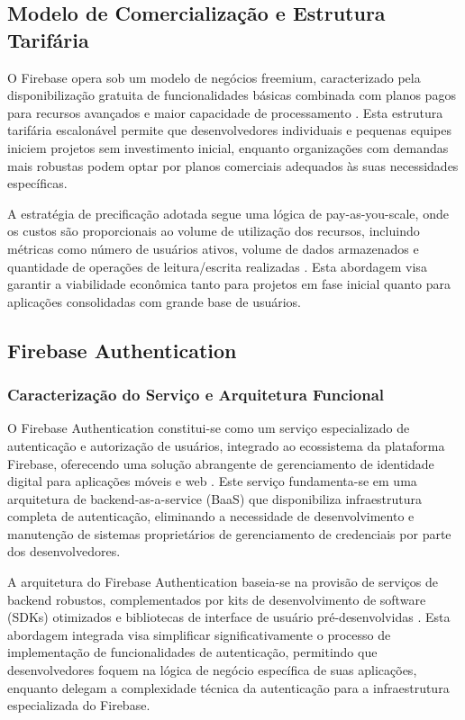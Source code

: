 \subsection{Modelo de Comercialização e Estrutura Tarifária}

O Firebase opera sob um modelo de negócios freemium, caracterizado pela disponibilização gratuita de funcionalidades básicas combinada com planos pagos para recursos avançados e maior capacidade de processamento \cite{google2023pricing}. Esta estrutura tarifária escalonável permite que desenvolvedores individuais e pequenas equipes iniciem projetos sem investimento inicial, enquanto organizações com demandas mais robustas podem optar por planos comerciais adequados às suas necessidades específicas.

A estratégia de precificação adotada segue uma lógica de pay-as-you-scale, onde os custos são proporcionais ao volume de utilização dos recursos, incluindo métricas como número de usuários ativos, volume de dados armazenados e quantidade de operações de leitura/escrita realizadas \cite{moroney2022firebase}. Esta abordagem visa garantir a viabilidade econômica tanto para projetos em fase inicial quanto para aplicações consolidadas com grande base de usuários.

\subsection{Firebase Authentication}

\subsubsection{Caracterização do Serviço e Arquitetura Funcional}

O Firebase Authentication constitui-se como um serviço especializado de autenticação e autorização de usuários, integrado ao ecossistema da plataforma Firebase, oferecendo uma solução abrangente de gerenciamento de identidade digital para aplicações móveis e web \cite{google2023firebaseauth}. Este serviço fundamenta-se em uma arquitetura de backend-as-a-service (BaaS) que disponibiliza infraestrutura completa de autenticação, eliminando a necessidade de desenvolvimento e manutenção de sistemas proprietários de gerenciamento de credenciais por parte dos desenvolvedores.

A arquitetura do Firebase Authentication baseia-se na provisão de serviços de backend robustos, complementados por kits de desenvolvimento de software (SDKs) otimizados e bibliotecas de interface de usuário pré-desenvolvidas \cite{firebase2023sdk}. Esta abordagem integrada visa simplificar significativamente o processo de implementação de funcionalidades de autenticação, permitindo que desenvolvedores foquem na lógica de negócio específica de suas aplicações, enquanto delegam a complexidade técnica da autenticação para a infraestrutura especializada do Firebase.

